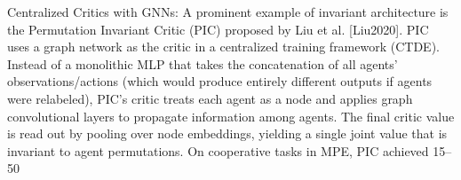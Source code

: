 \documentclass{article}
\begin{document}
Centralized Critics with GNNs: A prominent example of invariant architecture is the Permutation Invariant Critic (PIC) proposed by Liu et al. [Liu2020]. PIC uses a graph network as the critic in a centralized training framework (CTDE). Instead of a monolithic MLP that takes the concatenation of all agents’ observations/actions (which would produce entirely different outputs if agents were relabeled), PIC’s critic treats each agent as a node and applies graph convolutional layers to propagate information among agents. The final critic value is read out by pooling over node embeddings, yielding a single joint value that is invariant to agent permutations. On cooperative tasks in MPE, PIC achieved 15–50%
\end{document}
